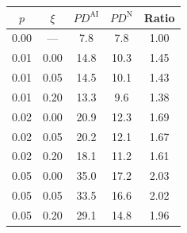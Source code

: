 \begin{tabular}{cc ccc}
\toprule
$p$ & $\xi$ & $PD^{\text{AI}}$ & $PD^{\text{N}}$ & Ratio \\
\midrule
0.00 & --- & 7.8 & 7.8 & 1.00 \\
\midrule
0.01 & 0.00 & 14.8 & 10.3 & 1.45 \\
0.01 & 0.05 & 14.5 & 10.1 & 1.43 \\
0.01 & 0.20 & 13.3 & 9.6 & 1.38 \\
0.02 & 0.00 & 20.9 & 12.3 & 1.69 \\
0.02 & 0.05 & 20.2 & 12.1 & 1.67 \\
0.02 & 0.20 & 18.1 & 11.2 & 1.61 \\
0.05 & 0.00 & 35.0 & 17.2 & 2.03 \\
0.05 & 0.05 & 33.5 & 16.6 & 2.02 \\
0.05 & 0.20 & 29.1 & 14.8 & 1.96 \\
\bottomrule
\end{tabular}

